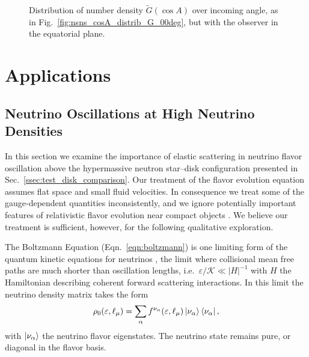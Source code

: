 \documentclass[aps,floatfix,prd,superscriptaddress,twocolumn]{revtex4-1}
\begin{document}
\begin{figure}
  \resizebox{\columnwidth}{!}{}
  \caption{Distribution of number density $\tilde{G}(\cos A)$ over incoming angle,
    as in Fig.~\ref{fig:nsns_cosA_distrib_G_00deg},
    but with the observer in the equatorial plane.}
  \label{fig:nsns_cosA_distrib_G_90deg}
\end{figure}

\section{Applications}
\label{sec:applications}

\subsection{Neutrino Oscillations at High Neutrino Densities}
\label{ssec:V_nunu}
In this section we examine the importance of elastic scattering in neutrino
flavor oscillation above the hypermassive neutron star--disk configuration
presented in Sec.~\ref{ssec:test_disk_comparison}.
Our treatment of the flavor evolution equation assumes flat space and small fluid
velocities.
In consequence we treat some of the gauge-dependent quantities inconsistently,
and we ignore potentially important features of relativistic flavor evolution
near compact objects \cite{yang2017-gr_nu_oscillations}.
We believe our treatment is sufficient, however, for the following qualitative
exploration.

The Boltzmann Equation (Eqn.~\ref{eqn:boltzmann}) is one limiting
form of the quantum kinetic equations for neutrinos
\cite{vlas2014-neutrino_qkes},
the limit where collisional mean free paths are much shorter
than oscillation lengths, i.e.\ $\varepsilon/\mathscr{K} \ll |H|^{-1}$
with $H$ the Hamiltonian describing coherent forward scattering interactions.
In this limit the neutrino density matrix takes the form
\begin{equation}
  \label{eqn:density_rho_0}
  \rho_0(\varepsilon,\ell_\mu) =
  \sum\limits_{\alpha}f^{\nu_\alpha}(\varepsilon,\ell_\mu)
  \ket{\nu_\alpha} \bra{\nu_\alpha},
\end{equation}
with $\ket{\nu_\alpha}$ the neutrino flavor eigenstates.
The neutrino state remains pure, or diagonal in the flavor basis.
\end{document}
